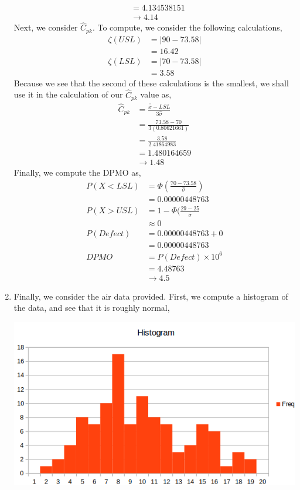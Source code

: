 \documentclass[letterpaper,10pt]{article}
\begin{document}
\begin{enumerate}
\begin{align*}
&=4.134538151\\
&\to 4.14
\end{align*}
Next, we consider $\hat{C}_{pk}$. To compute, we consider the following calculations,
\begin{align*}
\zeta(USL) &= |90-73.58|\\
&= 16.42\\
\zeta(LSL) &= |70-73.58|\\
&=3.58
\end{align*}
Because we see that the second of these calculations is the smallest, we shall use it in the calculation of our $\hat{C}_{pk}$ value as,
\begin{align*}
\hat{C}_{pk} &= \frac{\bar{\bar{x}}-LSL}{3\hat{\sigma}}\\
&=\frac{73.58-70}{3(0.80621661)}\\
&=\frac{3.58}{2.41864983}\\
&=1.480164659\\
&\to 1.48
\end{align*}
Finally, we compute the DPMO as,
\begin{align*}
P(X<LSL) &=\Phi(\frac{70-73.58}{\hat{\sigma}})\\
&=0.00000448763\\
P(X>USL) &= 1-\Phi(\frac{29-25}{\hat{\sigma}}\\
&\approx 0\\
P(Defect) &= 0.00000448763+0\\
&=0.00000448763\\
DPMO &= P(Defect)\times 10^6\\
&=4.48763\\
&\to 4.5
\end{align*}
\item Finally, we consider the air data provided. First, we compute a histogram of the data, and see that it is roughly normal,
\begin{center}
\includegraphics[scale=.60]{hist.png}

\end{center}
\end{enumerate}
\end{document}
